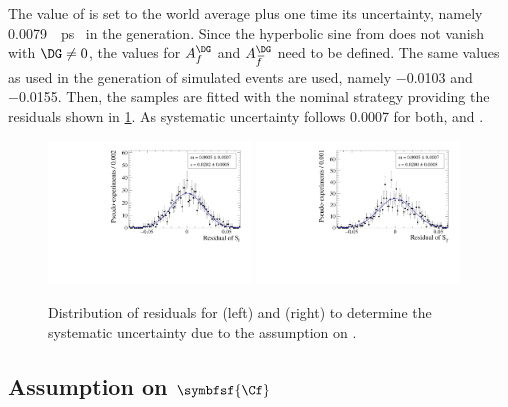 The value of \DG is set to the world average plus one time its uncertainty, namely \SI{0.0079}{\per\pico\second}~\cite{HFLAV2016} in the generation.
Since the hyperbolic sine from  does not vanish with $\DG\neq0$, the values for $A_f^{\DG}$ and $A_{\kern 1.5pt\overline{\kern -1.5pt f\kern 1.5pt}}^{\DG}$ need to be defined.
The same values as used in the generation of simulated events are used, namely \num{-0.0103} and \num{-0.0155}.
Then, the samples are fitted with the nominal strategy providing the residuals shown in \cref{fig:systUncertDG}.
As systematic uncertainty follows \num{0.0007} for both, \Sf and \Sfbar.
\begin{figure}[tbp]
    \centering
    \includegraphics[width=0.48\textwidth]{10Systematics/figs/DG_Sf_res.pdf}
    \includegraphics[width=0.48\textwidth]{10Systematics/figs/DG_Sfbar_res.pdf}
    \caption{Distribution of residuals for \Sf (left) and \Sfbar (right) to determine the systematic uncertainty due to the assumption on \DG.}
    \label{fig:systUncertDG}
\end{figure}

\subsection*{Assumption on $\symbfsf{\Cf}$}

